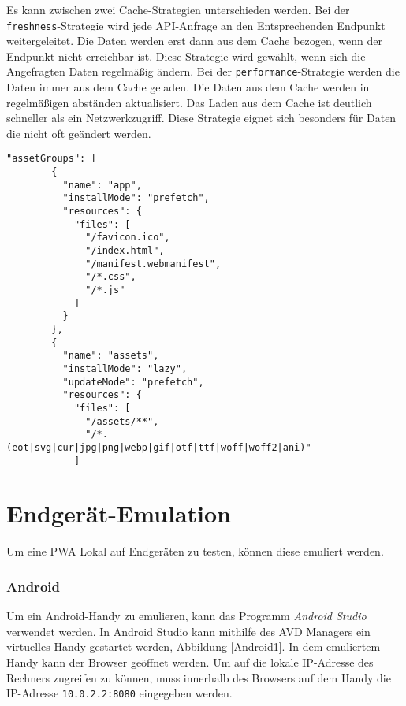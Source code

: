 Es kann zwischen zwei Cache-Strategien unterschieden werden.
Bei der \texttt{freshness}-Strategie wird jede API-Anfrage an den Entsprechenden Endpunkt weitergeleitet. 
Die Daten werden erst dann aus dem Cache bezogen, wenn der Endpunkt nicht erreichbar ist. Diese Strategie wird gewählt, wenn sich die Angefragten Daten regelmäßig ändern. 
Bei der \texttt{performance}-Strategie werden die Daten immer aus dem Cache geladen. Die Daten aus dem Cache werden in regelmäßigen abständen aktualisiert. Das Laden aus dem Cache ist deutlich schneller als ein Netzwerkzugriff. Diese Strategie eignet sich besonders für Daten die nicht oft geändert werden. 

\begin{lstlisting}[caption={Angular \textit{ngsw-config.json}-Datei zur Angabe der Ressourcen, die durch den Service Worker in den Cache gespeichert werden sollen}, label=lst:ngswConfig, float=!htb ]
    "assetGroups": [
        {
          "name": "app",
          "installMode": "prefetch",
          "resources": {
            "files": [
              "/favicon.ico",
              "/index.html",
              "/manifest.webmanifest",
              "/*.css",
              "/*.js"
            ]
          }
        },
        {
          "name": "assets",
          "installMode": "lazy",
          "updateMode": "prefetch",
          "resources": {
            "files": [
              "/assets/**",
              "/*.(eot|svg|cur|jpg|png|webp|gif|otf|ttf|woff|woff2|ani)"
            ] 
\end{lstlisting}






\section{Endgerät-Emulation}

Um eine PWA Lokal auf Endgeräten zu testen, können diese emuliert werden.   

\subsubsection{Android}
Um ein Android-Handy zu emulieren, kann das Programm \textit{Android Studio} verwendet werden. In Android Studio kann mithilfe des \ac{AVD Managers} ein virtuelles Handy gestartet werden, Abbildung \ref{Android1}. In dem emuliertem Handy kann der Browser geöffnet werden. Um auf die lokale IP-Adresse des Rechners zugreifen zu können, muss innerhalb des Browsers auf dem Handy die IP-Adresse \texttt{10.0.2.2:8080} eingegeben werden. 

